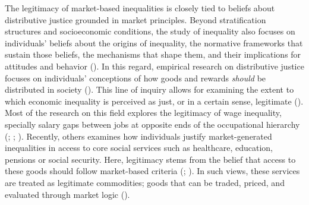 \documentclass[
  13pt,
]{article}
\begin{document}
The legitimacy of market-based inequalities is closely tied to beliefs
about distributive justice grounded in market principles. Beyond
stratification structures and socioeconomic conditions, the study of
inequality also focuses on individuals' beliefs about the origins of
inequality, the normative frameworks that sustain those beliefs, the
mechanisms that shape them, and their implications for attitudes and
behavior ().
In this regard, empirical research on distributive justice focuses on
individuals' conceptions of how goods and rewards \emph{should} be
distributed in society
(). This line of inquiry allows for examining the extent to which
economic inequality is perceived as just, or in a certain sense,
legitimate ().
Most of the research on this field explores the legitimacy of wage
inequality, specially salary gaps between jobs at opposite ends of the
occupational hierarchy
(;
;
). Recently,
others examines how individuals justify market-generated inequalities in
access to core social services such as healthcare, education, pensions
or social security. Here, legitimacy stems from the belief that access
to these goods should follow market-based criteria
(;
). In such views, these
services are treated as legitimate commodities; goods that can be
traded, priced, and evaluated through market logic
().
\end{document}
